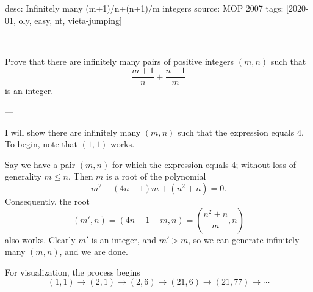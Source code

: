 desc: Infinitely many (m+1)/n+(n+1)/m integers
source: MOP 2007
tags: [2020-01, oly, easy, nt, vieta-jumping]

---

Prove that there are infinitely many pairs of positive integers $(m,n)$ such that \[\frac{m+1}n+\frac{n+1}m\]
is an integer.

---

I will show there are infinitely many $(m,n)$ such that the expression equals $4$. To begin, note that $(1,1)$ works.

Say we have a pair $(m,n)$ for which the expression equals $4$; without loss of generality $m\le n$. Then $m$ is a root of the polynomial \[m^2-(4n-1)m+\left(n^2+n\right)=0.\]
Consequently, the root \[(m',n)=(4n-1-m,n)=\left(\frac{n^2+n}m,n\right)\]
also works. Clearly $m'$ is an integer, and $m'>m$, so we can generate infinitely many $(m,n)$, and we are done.
\begin{remark}
    For visualization, the process begins \[(1,1)\to(2,1)\to(2,6)\to(21,6)\to(21,77)\to\cdots\]
\end{remark}
